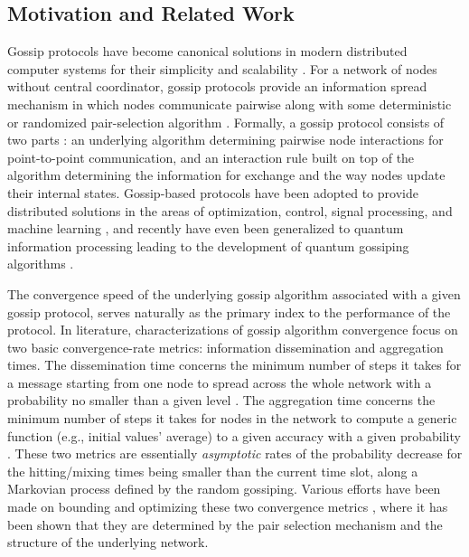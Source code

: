 \documentclass[a4paper, 11pt]{article}
\begin{document}
\subsection{Motivation and Related Work}
Gossip protocols have become canonical solutions in modern distributed computer systems for their simplicity and scalability \cite{Eugster2003,Jelasity2005,Shah2008}. For a network of nodes without central coordinator, gossip protocols provide an information spread mechanism in which nodes communicate pairwise along with some deterministic or randomized pair-selection algorithm \cite{Demers1987}. Formally, a gossip protocol consists of two parts \cite{Kempe2004}: an underlying  algorithm determining pairwise node interactions for point-to-point  communication, and an interaction rule built on top of the algorithm determining  the information for exchange  and the way nodes update their internal states. Gossip-based  protocols have  been adopted  to provide distributed solutions in the areas of optimization, control, signal processing, and machine learning \cite{Nedic2010,Bullo 2012,Moura2010,Rabbat2013}, {  and recently  have even been generalized to quantum information processing leading to the development of quantum gossiping algorithms \cite{Mazzarella2013a,Mazzarella2013b}.}

The convergence speed of the underlying gossip algorithm associated with a given gossip protocol, serves naturally as the primary index to the performance of the protocol. In literature, characterizations of gossip algorithm convergence focus on two basic convergence-rate metrics: information dissemination and aggregation times. The dissemination  time concerns the minimum number of steps it takes for a message starting from one node to spread across the whole network with a probability no smaller than a given level \cite{Karp 2000}. The  aggregation time concerns the minimum number of steps it takes  for nodes in the network to compute a generic function (e.g., initial values' average) to a given accuracy with a given probability \cite{Kempe2003}. These two metrics are essentially  {\em asymptotic} rates of the probability decrease for the hitting/mixing times being  smaller than the current time slot, along a Markovian process defined by the random gossiping. Various efforts have been made on bounding and optimizing these two convergence metrics \cite{Frieze 1985,Pittel1987,Karp2000, Kempe2003,Boyd2006,Boyd2004,Benezit2010,Murray2012, Doerr2012, Iutzeler2013,Liu2011}, where it has been shown that they are  determined by the pair selection mechanism and the structure of the underlying network.
\end{document}

